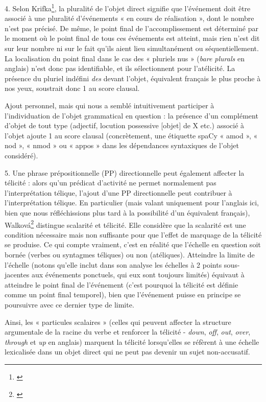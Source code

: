 4. Selon Krifka\footnote{\cite{rothstein_what_nodate}}, la pluralité de l'objet direct signifie que l'événement doit être associé à une pluralité d'événements « en cours de réalisation », dont le nombre n'est pas précisé. De même, le point final de l'accomplissement est déterminé par le moment où le point final de tous ces événements est atteint, mais rien n'est dit sur leur nombre ni sur le fait qu'ils aient lieu simultanément ou séquentiellement. La localisation du point final dans le cas des « pluriels nus » (\textit{bare plurals} en anglais) n'est donc pas identifiable, et ils sélectionnent pour l'atélicité. La présence du pluriel indéfini \textit{des} devant l'objet, équivalent français le plus proche à nos yeux, soustrait donc 1 au score clausal.

Ajout personnel, mais qui nous a semblé intuitivement participer à l'individuation de l'objet grammatical en question : la présence d'un complément d'objet de tout type (adjectif, locution possessive [objet] de X etc.) associé à l'objet ajoute 1 au score clausal (concrètement, une étiquette spaCy « amod », « nod », « nmod » ou « appos » dans les dépendances syntaxiques de l'objet considéré). 

5. Une phrase prépositionnelle (PP) directionnelle peut également affecter la télicité : alors qu'un prédicat d'activité ne permet normalement pas l'interprétation télique, l'ajout d'une PP directionnelle peut contribuer à l'interprétation télique. En particulier (mais valant uniquement pour l'anglais ici, bien que nous réfléchissions plus tard à la possibilité d'un équivalent français), Walková\footnote{\cite{walkova_particle_2017}} distingue scalarité et télicité. Elle considère que la scalarité est une condition nécessaire mais non suffisante pour que l'effet de marquage de la télicité se produise. Ce qui compte vraiment, c'est en réalité que l'échelle en question soit bornée (verbes ou syntagmes téliques) ou non (atéliques). Atteindre la limite de l'échelle (notons qu'elle inclut dans son analyse les échelles à 2 points sous-jacentes aux événements ponctuels, qui eux sont toujours limités) équivaut à atteindre le point final de l'événement (c'est pourquoi la télicité est définie comme un point final temporel), bien que l'événement puisse en principe se poursuivre avec ce dernier type de limite.

Ainsi, les « particules scalaires » (celles qui peuvent affecter la structure argumentale de la racine du verbe et renforcer la télicité - \textit{down}, \textit{off}, \textit{out}, \textit{over}, \textit{through} et \textit{up} en anglais) marquent la télicité lorsqu'elles se réfèrent à une échelle lexicalisée dans un objet direct qui ne peut pas devenir un sujet non-accusatif.

